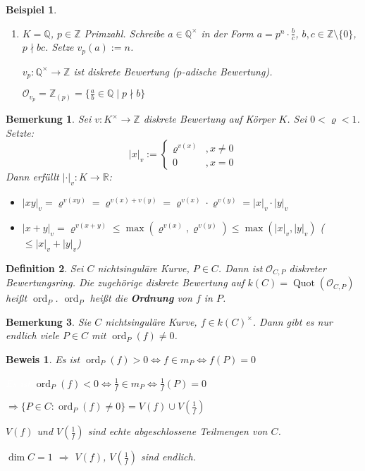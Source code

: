 \documentclass[a4paper, 12pt, numbers=noendperiod, chapterprefix=true, headsepline]{scrbook}
\theoremstyle{break}
\newtheorem{Def}{Definition}[section]
\newtheorem{Bem}[Def]{Bemerkung}
\theoremstyle{nonumberbreak}
\newtheorem{nnBsp}{Beispiel}
\newtheorem{Bew}{Beweis}
\theoremstyle{nonumberplain}
\newcommand{\quot}[1]{\textrm{\glqq}{#1}\textrm{\grqq}}
\newcommand{\emp}[1]{\textbf{\emph{#1}}}
\newcommand{\defterm}[1]{{\index{#1}}\emp{#1}}
\DeclareMathOperator{\Quot}{Quot}
\DeclareMathOperator{\ord}{ord}
\newcommand{\R}{\mathbb{R}}
\newcommand{\Z}{\mathbb{Z}}
\newcommand{\Q}{\mathbb{Q}}
\newcommand{\calO}{\mathcal{O}}
\newcommand{\X}{\times}
\begin{document}
\begin{nnBsp}\begin{enumerate}[1)]\item[3)]
$K=\Q$, $p\in \Z$ Primzahl. Schreibe $a\in \Q^\times$ in der Form $a=p^n\cdot\frac{b}{c}$, $b,c\in\Z\setminus\{0\}$, $p\nmid bc$. Setze $v_p(a):=n$.

$v_p:\Q^\times\to\Z$ ist diskrete Bewertung (\quot{$p$-adische Bewertung}).

$\calO_{v_p}=\Z_{(p)}=\{\frac{a}{b}\in\Q\mid p\nmid b\}$
\end{enumerate}\end{nnBsp}

\begin{Bem}
Sei $v:K^\X\to\Z$ diskrete Bewertung auf K\"orper $K$. Sei $0<\varrho<1$. Setzte:
	\[|x|_v:=\left\{\begin{array}{lr}\varrho^{v(x)} & ,x\ne 0\\0 & ,x=0\end{array}\right.\]
Dann erf\"ullt $|\cdot|_v:K\to\R$:\begin{itemize}
\item$|xy|_v=\varrho^{v(xy)}=\varrho^{v(x)+v(y)}=\varrho^{v(x)}\cdot\varrho^{v(y)}=|x|_v\cdot|y|_v$
\item$|x+y|_v=\varrho^{v(x+y)}\le\max(\varrho^{v(x)},\varrho^{v(y)})\le\max(|x|_v,|y|_v)$ ($\le|x|_v+|y|_v$)
\end{itemize}\end{Bem}

\begin{Def}
Sei $C$ nichtsingul\"are Kurve, $P\in C$. Dann ist $\calO_{C,P}$ diskreter Bewertungsring. Die zugeh\"orige diskrete Bewertung auf $k(C)=\Quot(\calO_{C,P})$ hei\ss t $\ord_P$. $\ord_P$ hei\ss t die \defterm{Ordnung} von $f$ in $P$.
\end{Def}

\begin{Bem}\label{20.8}
Sie $C$ nichtsingul\"are Kurve, $f\in k(C)^\X$. Dann gibt es nur endlich viele $P\in C$ mit $\ord_P(f)\ne0$.
\end{Bem}

\begin{Bew}
Es ist $\ord_P(f) > 0 \Leftrightarrow f \in m_P \Leftrightarrow f(P)=0$

\textcolor{white}{Es ist} $\ord_P(f) < 0 \Leftrightarrow \frac{1}{f} \in m_P \Leftrightarrow \frac{1}{f}(P)=0$

$\Rightarrow \{P\in C: \ord_P(f)\ne0\} = V(f)\cup V(\frac{1}{f})$

$V(f)$ und $V(\frac{1}{f})$ sind echte abgeschlossene Teilmengen von $C$.

$\dim C=1$ $\Rightarrow$ $V(f)$, $V(\frac{1}{f})$ sind endlich.
\end{Bew}
\end{document}
